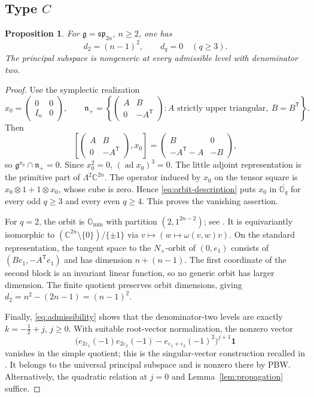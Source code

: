 \documentclass[11pt]{amsart}
\newtheorem{proposition}[theorem]{Proposition}
\theoremstyle{definition}
\theoremstyle{remark}
\newcommand{\C}{\mathbb C}
\newcommand{\g}{\mathfrak g}
\newcommand{\n}{\mathfrak n_+}
\newcommand{\vac}{\mathbf1}
\newcommand{\spalg}{\mathfrak{sp}}
\DeclareMathOperator{\ad}{ad}
\begin{document}
\subsection{Type \texorpdfstring{$C$}{C}}
\begin{proposition}\label{prop:typeC}
For $\g=\spalg_{2n}$, $n\ge2$, one has
\[
 d_2=(n-1)^2,\qquad d_q=0\quad(q\ge3).
\]
The principal subspace is nongeneric at every admissible level with
denominator two.
\end{proposition}
\begin{proof}
Use the symplectic realization
\[
 x_0=\begin{pmatrix}0&0\\I_n&0\end{pmatrix},\qquad
 \n=\left\{\begin{pmatrix}A&B\\0&-A^{\mathsf T}\end{pmatrix}:
 A\text{ strictly upper triangular},\ B=B^{\mathsf T}\right\}.
\]
Then
\[
 \left[\begin{pmatrix}A&B\\0&-A^{\mathsf T}\end{pmatrix},x_0\right]
 =\begin{pmatrix}B&0\\-A^{\mathsf T}-A&-B\end{pmatrix},
\]
so $\g^{x_0}\cap\n=0$. Since $x_0^2=0$,
$(\ad x_0)^3=0$. The little adjoint representation is the primitive
part of $\Lambda^2\C^{2n}$. The operator induced by $x_0$ on the
tensor square is $x_0\otimes1+1\otimes x_0$, whose cube is zero.
Hence \eqref{eq:orbit-description} puts $x_0$ in
$\overline{\mathbb O_q}$ for every odd $q\ge3$ and every even
$q\ge4$. This proves the vanishing assertion.

For $q=2$, the orbit is $\mathbb O_{\min}$ with partition
$(2,1^{2n-2})$; see \cite{AvEM}. It is equivariantly isomorphic to
$(\C^{2n}\setminus\{0\})/\{\pm1\}$ via
$v\mapsto(w\mapsto\omega(v,w)v)$. On the standard representation,
the tangent space to the $N_+$-orbit of $(0,e_1)$ consists of
$(Be_1,-A^{\mathsf T}e_1)$ and has dimension $n+(n-1)$.
The first coordinate of the second block is an invariant linear
function, so no generic orbit has larger dimension. The finite
quotient preserves orbit dimensions, giving
$d_2=n^2-(2n-1)=(n-1)^2$.

Finally, \eqref{eq:admissibility} shows that the denominator-two
levels are exactly $k=-\frac12+j$, $j\ge0$. With suitable root-vector
normalization, the nonzero vector
\[
 \bigl(e_{2\varepsilon_1}(-1)e_{2\varepsilon_2}(-1)
       -e_{\varepsilon_1+\varepsilon_2}(-1)^2\bigr)^{j+1}\vac
\]
vanishes in the simple quotient; this is the singular-vector
construction recalled in \cite[Theorem~4.2(3)]{AMJoseph}.
It belongs to the universal principal subspace and is nonzero there
by PBW. Alternatively, the quadratic relation at $j=0$ and
Lemma~\ref{lem:propagation} suffice.
\end{proof}
\end{document}
